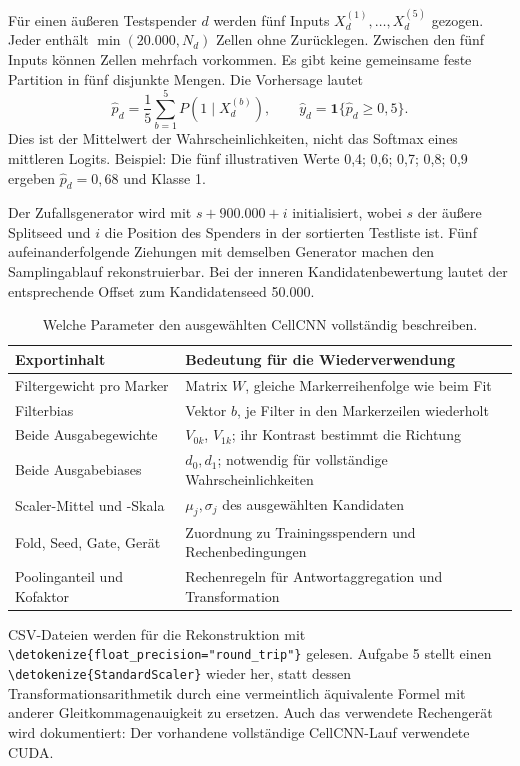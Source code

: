\documentclass[11pt,a4paper]{article}
\newcommand{\code}[1]{\expandafter\nolinkurl\expandafter{\detokenize{#1}}}
\begin{document}
Für einen äußeren Testspender \(d\) werden fünf Inputs \(X_d^{(1)},\dots,
X_d^{(5)}\) gezogen. Jeder enthält \(\min(20.000,N_d)\) Zellen ohne
Zurücklegen. Zwischen den fünf Inputs können Zellen mehrfach vorkommen.
Es gibt keine gemeinsame feste Partition in fünf disjunkte Mengen.
Die Vorhersage lautet
\[
 \widehat p_d=\frac15\sum_{b=1}^5P(1\mid X_d^{(b)}),\qquad
 \widehat y_d=\mathbf1\{\widehat p_d\ge0{,}5\}.
\]
Dies ist der Mittelwert der Wahrscheinlichkeiten, nicht das Softmax eines
mittleren Logits. Beispiel: Die fünf illustrativen Werte 0,4; 0,6; 0,7;
0,8; 0,9 ergeben \(\widehat p_d=0{,}68\) und Klasse 1.

Der Zufallsgenerator wird mit \(s+900.000+i\) initialisiert, wobei \(s\)
der äußere Splitseed und \(i\) die Position des Spenders in der sortierten
Testliste ist. Fünf aufeinanderfolgende Ziehungen mit demselben Generator
machen den Samplingablauf rekonstruierbar. Bei der inneren Kandidatenbewertung
lautet der entsprechende Offset zum Kandidatenseed 50.000.

\begin{table}[!ht]\centering\small
\caption{Welche Parameter den ausgewählten CellCNN vollständig beschreiben.}
\begin{tabular}{p{5cm}p{10cm}}\toprule
Exportinhalt & Bedeutung für die Wiederverwendung\\\midrule
Filtergewicht pro Marker & Matrix \(W\), gleiche Markerreihenfolge wie beim Fit\\
Filterbias & Vektor \(b\), je Filter in den Markerzeilen wiederholt\\
Beide Ausgabegewichte & \(V_{0k}\), \(V_{1k}\); ihr Kontrast bestimmt die Richtung\\
Beide Ausgabebiases & \(d_0,d_1\); notwendig für vollständige Wahrscheinlichkeiten\\
Scaler-Mittel und -Skala & \(\mu_j,\sigma_j\) des ausgewählten Kandidaten\\
Fold, Seed, Gate, Gerät & Zuordnung zu Trainingsspendern und Rechenbedingungen\\
Poolinganteil und Kofaktor & Rechenregeln für Antwortaggregation und Transformation\\
\bottomrule\end{tabular}
\end{table}

CSV-Dateien werden für die Rekonstruktion mit
\code{float_precision="round_trip"} gelesen. Aufgabe 5 stellt einen
\code{StandardScaler} wieder her, statt dessen Transformationsarithmetik
durch eine vermeintlich äquivalente Formel mit anderer Gleitkommagenauigkeit
zu ersetzen. Auch das verwendete Rechengerät wird dokumentiert: Der
vorhandene vollständige CellCNN-Lauf verwendete CUDA.
\end{document}
